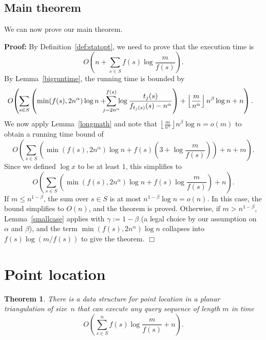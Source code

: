 \documentclass[11pt]{article}
\newtheorem{theorem}[figure]{Theorem}
\newenvironment{proof}{\noindent\textbf{Proof: }\ignorespaces}
  {\hspace*{\fill}$\Box$\medskip}
\newcommand{\eqdef}{:=}
\begin{document}
\subsection{Main theorem} 

We can now prove our main theorem.

\begin{proof}[of Theorem~\ref{main}]
By Definition~\ref{def:statopt}, we need to prove that
the execution time is
\[ 
O \left( n +  \sum_{s \in S} f(s)\log \frac{m}{f(s)}\right).
\]
By Lemma~\ref{bigruntime}, the running time is bounded by
\[
\hspace{-9pt} O\hspace{-2pt}\left(\hspace{-2pt}
\rule{0cm}{21pt} \sum_{s \in S} \left( \min(f(s), 2 n^\alpha) \log n +
\hspace{-7pt} \sum_{j=2n^\alpha}^{f(s)} \hspace{-4pt}\log
\frac{t_j(s)}{f_{t_j(s)}(s)-n^\alpha}\right) + 
\left \lfloor \frac{m}{n^\alpha} \right \rfloor n^\beta\log n + n
\rule{0cm}{21pt} \right). 
\]
We now apply Lemma~\ref{longmath} and note that $\left \lfloor
\frac{m}{n^\alpha} \right \rfloor n^\beta\log n = o(m)$ to obtain 
a running time bound of
\[ 
O \left( \sum_{s \in S} \left( \min(f(s), 2 n^\alpha) \log n + f(s)
\left(3+ \log \frac{m}{f(s)}\right) \right) + n + m \right).
\]
Since we defined $\log x$ to be at least $1$, this simplifies to
\[ 
O \left( \sum_{s \in S} \left( \min(f(s), 2 n^\alpha) \log n + f(s)\log
\frac{m}{f(s)} \right) + n \right).
\]
If $m\leq n^{1-\beta}$, the sum over $s \in S$ is at most 
$n^{1-\beta}\log n = o(n)$. In this case, the bound simplifies 
to $O(n)$,  and the theorem is proved. Otherwise,
if $m > n^{1-\beta}$, Lemma~\ref{smallcase} applies with
$\gamma \eqdef 1 - \beta$ (a legal choice by our assumption on
$\alpha$ and $\beta$), and  the term
$\min(f(s), 2 n^\alpha) \log n$ collapses into $f(s)\log (m /f(s))$
to give the theorem.  
\end{proof}



\section{Point location}


\begin{theorem}\label{ppl} 
There is a data structure for point location
in a planar triangulation of size~$n$ that can execute any query sequence of
length $m$ in time 
\[ 
O \left( \sum_{s \in S}^n f(s)\log \frac{m}{f(s)} + n \right).
\] 
\end{theorem}
\end{document}
